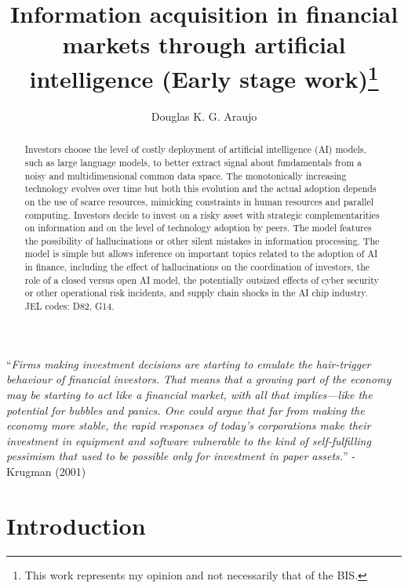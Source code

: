 \documentclass[
]{article}
\title{Information acquisition in financial markets through artificial
intelligence (Early stage work)\thanks{This work represents my opinion
and not necessarily that of the BIS.}}
\author{Douglas K. G. Araujo}
\affil{%
                  Bank for International
Settlements, douglas.araujo@bis.org
              }
\date{}
\theoremstyle{plain}
\theoremstyle{remark}
\begin{document}
\maketitle
\begin{abstract}
Investors choose the level of costly deployment of artificial
intelligence (AI) models, such as large language models, to better
extract signal about fundamentals from a noisy and multidimensional
common data space. The monotonically increasing technology evolves over
time but both this evolution and the actual adoption depends on the use
of scarce resources, mimicking constraints in human resources and
parallel computing. Investors decide to invest on a risky asset with
strategic complementarities on information and on the level of
technology adoption by peers. The model features the possibility of
hallucinations or other silent mistakes in information processing. The
model is simple but allows inference on important topics related to the
adoption of AI in finance, including the effect of hallucinations on the
coordination of investors, the role of a closed versus open AI model,
the potentially outsized effects of cyber security or other operational
risk incidents, and supply chain shocks in the AI chip industry. JEL
codes: D82, G14.
\end{abstract}
\ifdefined\Shaded\renewenvironment{Shaded}{\begin{tcolorbox}[boxrule=0pt, interior hidden, sharp corners, frame hidden, borderline west={3pt}{0pt}{shadecolor}, enhanced, breakable]}{\end{tcolorbox}}\fi

``\emph{Firms making investment decisions are starting to emulate the
hair-trigger behaviour of financial investors. That means that a growing
part of the economy may be starting to act like a financial market, with
all that implies---like the potential for bubbles and panics. One could
argue that far from making the economy more stable, the rapid responses
of today's corporations make their investment in equipment and software
vulnerable to the kind of self-fulfilling pessimism that used to be
possible only for investment in paper assets.}'' - Krugman (2001)

\hypertarget{introduction}{%
\section{Introduction}\label{introduction}}
\end{document}
